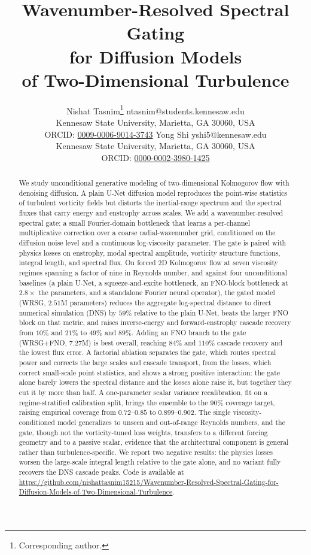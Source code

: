 \documentclass[10pt]{article} %
\title{Wavenumber-Resolved Spectral Gating\\for Diffusion Models\\of Two-Dimensional Turbulence}
\author{\name Nishat Tasnim\thanks{Corresponding author.} \email ntasnim@students.kennesaw.edu \\
      \addr Kennesaw State University, Marietta, GA 30060, USA \\
      \addr ORCID: \href{https://orcid.org/0009-0006-9014-3743}{0009-0006-9014-3743}
      \AND
      \name Yong Shi \email yshi5@kennesaw.edu \\
      \addr Kennesaw State University, Marietta, GA 30060, USA \\
      \addr ORCID: \href{https://orcid.org/0000-0002-3980-1425}{0000-0002-3980-1425}}
\def\coderepopublic{\url{https://github.com/nishattasnim15215/Wavenumber-Resolved-Spectral-Gating-for-Diffusion-Models-of-Two-Dimensional-Turbulence}}
\def\coderepo{\coderepopublic}
\begin{document}
\maketitle

\begin{abstract}
We study unconditional generative modeling of two-dimensional Kolmogorov flow with denoising diffusion. A plain U-Net diffusion model reproduces the point-wise statistics of turbulent vorticity fields but distorts the inertial-range spectrum and the spectral fluxes that carry energy and enstrophy across scales. We add a wavenumber-resolved spectral gate: a small Fourier-domain bottleneck that learns a per-channel multiplicative correction over a coarse radial-wavenumber grid, conditioned on the diffusion noise level and a continuous log-viscosity parameter. The gate is paired with physics losses on enstrophy, modal spectral amplitude, vorticity structure functions, integral length, and spectral flux. On forced 2D Kolmogorov flow at seven viscosity regimes spanning a factor of nine in Reynolds number, and against four unconditional baselines (a plain U-Net, a squeeze-and-excite bottleneck, an FNO-block bottleneck at $2.8\times$ the parameters, and a standalone Fourier neural operator), the gated model (WRSG, $2.51$M parameters) reduces the aggregate log-spectral distance to direct numerical simulation (DNS) by $59\%$ relative to the plain U-Net, beats the larger FNO block on that metric, and raises inverse-energy and forward-enstrophy cascade recovery from $10\%$ and $21\%$ to $49\%$ and $89\%$. Adding an FNO branch to the gate (WRSG+FNO, $7.27$M) is best overall, reaching $84\%$ and $110\%$ cascade recovery and the lowest flux error. A factorial ablation separates the gate, which routes spectral power and corrects the large scales and cascade transport, from the losses, which correct small-scale point statistics, and shows a strong positive interaction: the gate alone barely lowers the spectral distance and the losses alone raise it, but together they cut it by more than half. A one-parameter scalar variance recalibration, fit on a regime-stratified calibration split, brings the ensemble to the $90\%$ coverage target, raising empirical coverage from $0.72$--$0.85$ to $0.899$--$0.902$. The single viscosity-conditioned model generalizes to unseen and out-of-range Reynolds numbers, and the gate, though not the vorticity-tuned loss weights, transfers to a different forcing geometry and to a passive scalar, evidence that the architectural component is general rather than turbulence-specific. We report two negative results: the physics losses worsen the large-scale integral length relative to the gate alone, and no variant fully recovers the DNS cascade peaks. Code is available at \coderepo.
\end{abstract}
\end{document}
